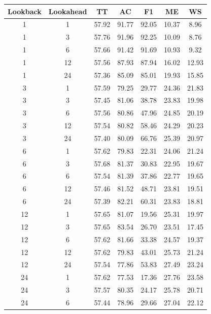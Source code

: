 \newpage
\begin{table}[H]
	\centering
	\begin{tabular}{|c|c||c|c|c|c|c|}
		\hline
		\textbf{Lookback} & \textbf{Lookahead} & \textbf{TT} & \textbf{AC} & \textbf{F1} & \textbf{ME} & \textbf{WS} \\
		\hline \hline
		 1 &  1 & 57.92 & 91.77 & 92.05 & 10.37 &  8.96 \\
		\hline
		 1 &  3 & 57.76 & 91.96 & 92.25 & 10.09 &  8.76 \\
		\hline
		 1 &  6 & 57.66 & 91.42 & 91.69 & 10.93 &  9.32 \\
		\hline
		 1 & 12 & 57.56 & 87.93 & 87.94 & 16.02 & 12.93 \\
		\hline
		 1 & 24 & 57.36 & 85.09 & 85.01 & 19.93 & 15.85 \\
		\hline
		 3 &  1 & 57.59 & 79.25 & 29.77 & 24.36 & 21.83 \\
		\hline
		 3 &  3 & 57.45 & 81.06 & 38.78 & 23.83 & 19.98 \\
		\hline
		 3 &  6 & 57.56 & 80.86 & 47.96 & 24.85 & 20.19 \\
		\hline
		 3 & 12 & 57.54 & 80.82 & 58.46 & 24.29 & 20.23 \\
		\hline
		 3 & 24 & 57.40 & 80.09 & 66.76 & 25.39 & 20.97 \\
		\hline
		 6 &  1 & 57.62 & 79.83 & 22.31 & 24.06 & 21.24 \\
		\hline
		 6 &  3 & 57.68 & 81.37 & 30.83 & 22.95 & 19.67 \\
		\hline
		 6 &  6 & 57.54 & 81.39 & 37.86 & 22.77 & 19.65 \\
		\hline
		 6 & 12 & 57.46 & 81.52 & 48.71 & 23.81 & 19.51 \\
		\hline
		 6 & 24 & 57.39 & 82.21 & 60.31 & 23.83 & 18.81 \\
		\hline
		12 &  1 & 57.65 & 81.07 & 19.56 & 25.31 & 19.97 \\
		\hline
		12 &  3 & 57.65 & 83.54 & 26.70 & 23.51 & 17.45 \\
		\hline
		12 &  6 & 57.62 & 81.66 & 33.38 & 24.57 & 19.37 \\
		\hline
		12 & 12 & 57.62 & 79.83 & 43.01 & 25.73 & 21.24 \\
		\hline
		12 & 24 & 57.54 & 77.86 & 53.83 & 27.49 & 23.24 \\
		\hline
		24 &  1 & 57.62 & 77.53 & 17.36 & 27.76 & 23.58 \\
		\hline
		24 &  3 & 57.57 & 80.35 & 24.17 & 25.78 & 20.71 \\
		\hline
		24 &  6 & 57.44 & 78.96 & 29.66 & 27.04 & 22.12 \\

\end{tabular}
\end{table}
